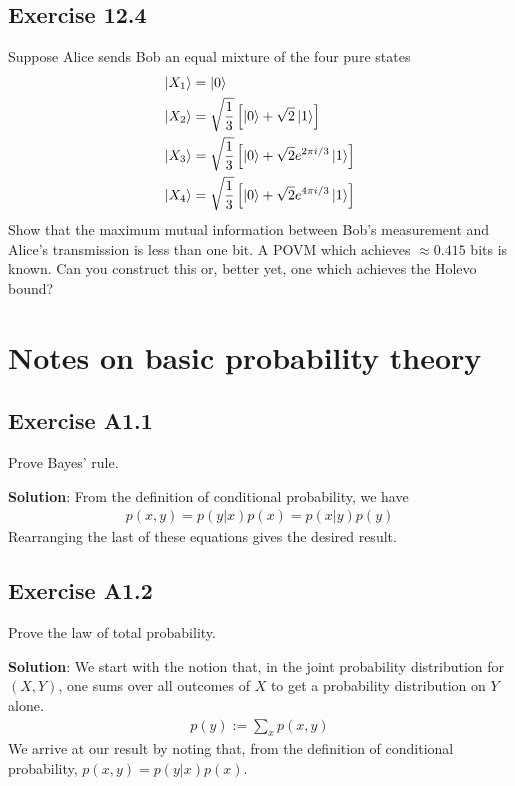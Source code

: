 \documentclass{book}
\begin{document}
\section*{Exercise 12.4}
    Suppose Alice sends Bob an equal mixture of the four pure states
    \begin{align}
        \ket{X_1} &= \ket{0} \\
        \ket{X_2} &= \sqrt{\frac{1}{3}}\left[\ket{0} + \sqrt{2}\ket{1}\right] \\
        \ket{X_3} &= \sqrt{\frac{1}{3}}\left[\ket{0} + \sqrt{2} e^{2\pi i /3}\ket{1}\right] \\
        \ket{X_4} &= \sqrt{\frac{1}{3}}\left[\ket{0} + \sqrt{2} e^{4\pi i /3}\ket{1}\right]
    \end{align}
    Show that the maximum mutual information between Bob’s measurement and Alice’s transmission is less than one bit. A POVM which achieves $\approx 0.415$ bits is known. Can you construct this or, better yet, one which achieves the Holevo bound?

\appendix
\renewcommand{\thechapter}{\arabic{chapter}}
\renewcommand{\theequation}{A\thechapter.\arabic{equation}}

\chapter{Notes on basic probability theory}

\section*{Exercise A1.1} 
    Prove Bayes' rule.
    
    \textbf{Solution}: From the definition of conditional probability, we have
    \begin{align}
        p(x,y) = p(y|x)p(x) = p(x|y)p(y)
    \end{align}
    Rearranging the last of these equations gives the desired result.

\section*{Exercise A1.2}
    Prove the law of total probability.
    
    \textbf{Solution}: We start with the notion that, in the joint probability distribution for $(X,Y)$, one sums over all outcomes of $X$ to get a probability distribution on $Y$ alone.
    \begin{align}
        p(y) := \sum_x p(x,y)
    \end{align}
    We arrive at our result by noting that, from the definition of conditional probability, $p(x,y) = p(y|x)p(x)$.
\end{document}
